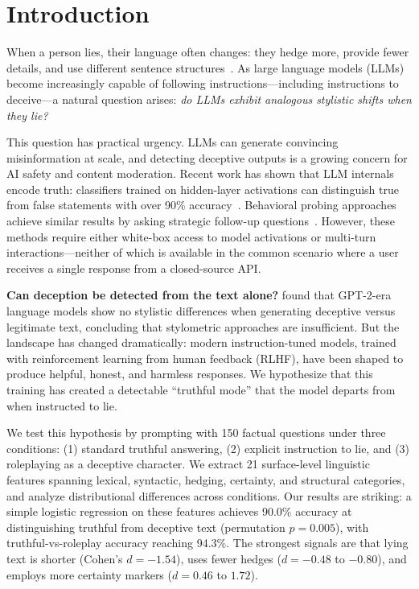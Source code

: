 \section{Introduction}
\label{sec:intro}

When a person lies, their language often changes: they hedge more, provide fewer details, and use different sentence structures~\citep{newman2003lying}.
As large language models (LLMs) become increasingly capable of following instructions---including instructions to deceive---a natural question arises: \emph{do LLMs exhibit analogous stylistic shifts when they lie?}

This question has practical urgency.
LLMs can generate convincing misinformation at scale, and detecting deceptive outputs is a growing concern for AI safety and content moderation.
Recent work has shown that LLM internals encode truth: classifiers trained on hidden-layer activations can distinguish true from false statements with over 90\% accuracy~\citep{azaria2023internal, marks2023geometry, burger2024truth}.
Behavioral probing approaches achieve similar results by asking strategic follow-up questions~\citep{pacchiardi2024catch}.
However, these methods require either white-box access to model activations or multi-turn interactions---neither of which is available in the common scenario where a user receives a single response from a closed-source API.

{\bf Can deception be detected from the text alone?}
\citet{schuster2019limitations} found that GPT-2-era language models show no stylistic differences when generating deceptive versus legitimate text, concluding that stylometric approaches are insufficient.
But the landscape has changed dramatically: modern instruction-tuned models, trained with reinforcement learning from human feedback (RLHF), have been shaped to produce helpful, honest, and harmless responses.
We hypothesize that this training has created a detectable ``truthful mode'' that the model departs from when instructed to lie.

We test this hypothesis by prompting \gptfour with 150 factual questions under three conditions: (1) standard truthful answering, (2) explicit instruction to lie, and (3) roleplaying as a deceptive character.
We extract 21 surface-level linguistic features spanning lexical, syntactic, hedging, certainty, and structural categories, and analyze distributional differences across conditions.
Our results are striking: a simple logistic regression on these features achieves 90.0\% accuracy at distinguishing truthful from deceptive text (permutation $p = 0.005$), with truthful-vs-roleplay accuracy reaching 94.3\%.
The strongest signals are that lying text is shorter (Cohen's $d = -1.54$), uses fewer hedges ($d = -0.48$ to $-0.80$), and employs more certainty markers ($d = 0.46$ to $1.72$).

